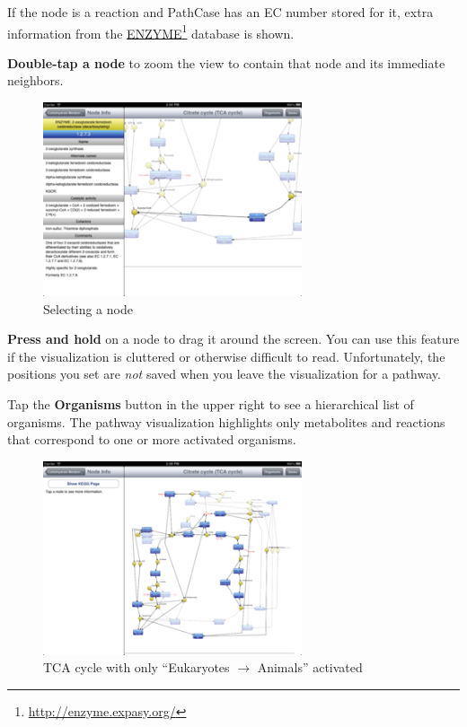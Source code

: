 If the node is a reaction and PathCase has an EC number stored for it, extra
information from the \href{http://enzyme.expasy.org/}{ENZYME}\footnote{\href{http://enzyme.expasy.org/}{http:/\slash enzyme.expasy.org\slash }} database is shown.

\textbf{Double-tap a node} to zoom the view to contain that node and its immediate
neighbors.

\begin{figure}[ht!]
\centering
\includegraphics[width=3in]{kegg_manual/selection_info.png}
\caption{Selecting a node}

\end{figure}



\textbf{Press and hold} on a node to drag it around the screen. You can use this
feature if the visualization is cluttered or otherwise difficult to read.
Unfortunately, the positions you set are \emph{not} saved when you leave the
visualization for a pathway.

Tap the \textbf{Organisms} button in the upper right to see a hierarchical list of
organisms. The pathway visualization highlights only metabolites and reactions
that correspond to one or more activated organisms.

\begin{figure}[ht!]
\centering
\includegraphics[width=3in]{kegg_manual/animals_only_graph.png}
\caption{TCA cycle with only ``Eukaryotes $\rightarrow$ Animals''
activated}

\end{figure}

